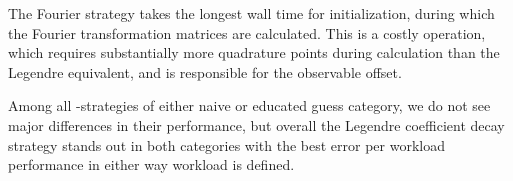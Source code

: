 The Fourier strategy takes the longest wall time for initialization, during which the Fourier transformation matrices are calculated. This is a costly operation, which requires substantially more quadrature points during calculation than the Legendre equivalent, and is responsible for the observable offset.

Among all \hp-strategies of either naive or educated guess category, we do not see major differences in their performance, but overall the Legendre coefficient decay strategy stands out in both categories with the best error per workload performance in either way workload is defined.



